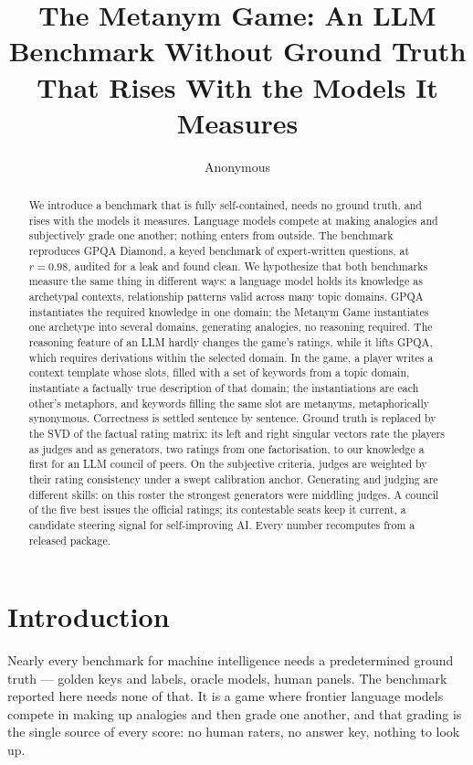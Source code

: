 \documentclass{article}
\title{The Metanym Game: An LLM Benchmark Without Ground Truth That Rises With the Models It Measures}
\author{Anonymous}
\begin{document}
\maketitle
\begin{abstract}

We introduce a benchmark that is fully self-contained, needs no ground truth, and rises with the models it measures. Language models compete at making analogies and subjectively grade one another; nothing enters from outside. The benchmark reproduces GPQA Diamond, a keyed benchmark of expert-written questions, at \(r = 0.98\), audited for a leak and found clean. We hypothesize that both benchmarks measure the same thing in different ways: a language model holds its knowledge as archetypal contexts, relationship patterns valid across many topic domains. GPQA instantiates the required knowledge in one domain; the Metanym Game instantiates one archetype into several domains, generating analogies, no reasoning required. The reasoning feature of an LLM hardly changes the game's ratings, while it lifts GPQA, which requires derivations within the selected domain. In the game, a player writes a context template whose slots, filled with a set of keywords from a topic domain, instantiate a factually true description of that domain; the instantiations are each other's metaphors, and keywords filling the same slot are metanyms, metaphorically synonymous. Correctness is settled sentence by sentence. Ground truth is replaced by the SVD of the factual rating matrix: its left and right singular vectors rate the players as judges and as generators, two ratings from one factorisation, to our knowledge a first for an LLM council of peers. On the subjective criteria, judges are weighted by their rating consistency under a swept calibration anchor. Generating and judging are different skills: on this roster the strongest generators were middling judges. A council of the five best issues the official ratings; its contestable seats keep it current, a candidate steering signal for self-improving AI. Every number recomputes from a released package.

\end{abstract}
\section{Introduction}\label{introduction}

Nearly every benchmark for machine intelligence needs a predetermined ground truth --- golden keys and labels, oracle models, human panels. The benchmark reported here needs none of that. It is a game where frontier language models compete in making up analogies and then grade one another, and that grading is the single source of every score: no human raters, no answer key, nothing to look up.
\end{document}
